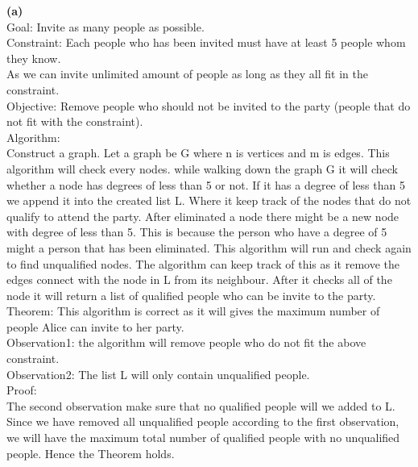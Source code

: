 \documentclass[a4paper, 11pt]{article}
\renewcommand{\part}[1] {\vspace{.10in} {\bf (#1)}}
\begin{document}
\part{a}\\
Goal: Invite as many people as possible.\\
Constraint: Each people who has been invited must have at least 5 people whom they know.\\
As we can invite unlimited amount of people as long as they all fit in the constraint.\\
Objective: Remove people who should not be invited to the party (people that do not fit with the constraint).\\
Algorithm:\\
Construct a graph. Let a graph be G where n is vertices and m is edges. This algorithm will check every nodes. while walking down the graph G it will check whether a node has degrees of less than 5 or not. If it has a degree of less than 5 we append it into the created list L. Where it keep track of the nodes that do not qualify to attend the party. After eliminated a node there might be a new node with degree of less than 5. This is because the person who have a degree of 5 might a person that has been eliminated. This algorithm will run and check again to find unqualified nodes. The algorithm can keep track of this as it remove the edges connect with the node in L from its neighbour. After it checks all of the node it will return a list of qualified people who can be invite to the party.\\
Theorem: This algorithm is correct as it will gives the maximum number of people Alice can invite to her party.\\
Observation1: the algorithm will remove people who do not fit the above constraint.\\
Observation2: The list L will only contain unqualified people.\\
Proof:\\
The second observation make sure that no qualified people will we added to L. Since we have removed all unqualified people according to the first observation, we will have the maximum total number of qualified people with no unqualified people. Hence the Theorem holds.
\end{document}
